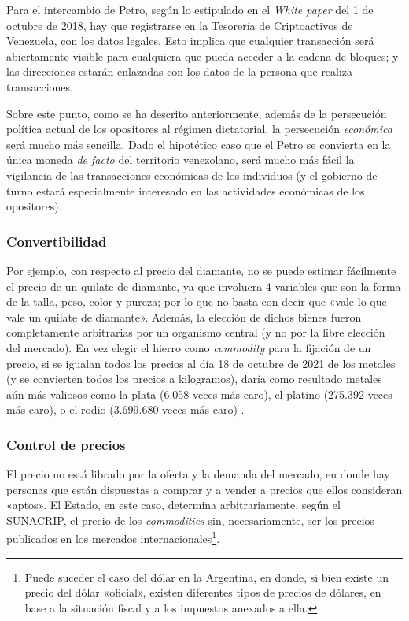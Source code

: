 \documentclass[12pt,a4paper,twoside]{book}
\begin{document}
Para el intercambio de Petro, según lo estipulado en el \textit{White paper} del 1 de octubre de 2018, hay que registrarse en la Tesorería de Criptoactivos de Venezuela, con los datos legales. Esto implica que cualquier transacción será abiertamente visible para cualquiera que pueda acceder a la cadena de bloques; y las direcciones estarán enlazadas con los datos de la persona que realiza transacciones.

Sobre este punto, como se ha descrito anteriormente, además de la persecución política actual de los opositores al régimen dictatorial, la persecución \textit{económica} será mucho más sencilla. Dado el hipotético caso que el Petro se convierta en la única moneda \textit{de facto} del territorio venezolano, será mucho más fácil la vigilancia de las transacciones económicas de los individuos (y el gobierno de turno estará especialmente interesado en las actividades económicas de los opositores).

\subsubsection{Convertibilidad}
Por ejemplo, con respecto al precio del diamante, no se puede estimar fácilmente el precio de un quilate de diamante, ya que involucra 4 variables que son la forma de la talla, peso, color y pureza; por lo que no basta con decir que «vale lo que vale un quilate de diamante». Además, la elección de dichos bienes fueron completamente arbitrarias por un organismo central (y no por la libre elección del mercado). En vez elegir el hierro como \textit{commodity} para la fijación de un precio, si se igualan todos los precios al día 18 de octubre de 2021 de los metales (y se convierten todos los precios a kilogramos), daría como resultado metales aún más valiosos como la plata (6.058 veces más caro), el platino (275.392 veces más caro), o el rodio (3.699.680 veces más caro) \cite{metales:precio}.

\subsubsection{Control de precios}
El precio no está librado por la oferta y la demanda del mercado, en donde hay personas que están dispuestas a comprar y a vender a precios que ellos consideran «aptos». El Estado, en este caso, determina arbitrariamente, según el SUNACRIP, el precio de los \textit{commodities} sin, necesariamente, ser los precios publicados en los mercados internacionales\footnote{Puede suceder el caso del dólar en la Argentina, en donde, si bien existe un precio del dólar «oficial», existen diferentes tipos de precios de dólares, en base a la situación fiscal y a los impuestos anexados a ella.}.
\end{document}
